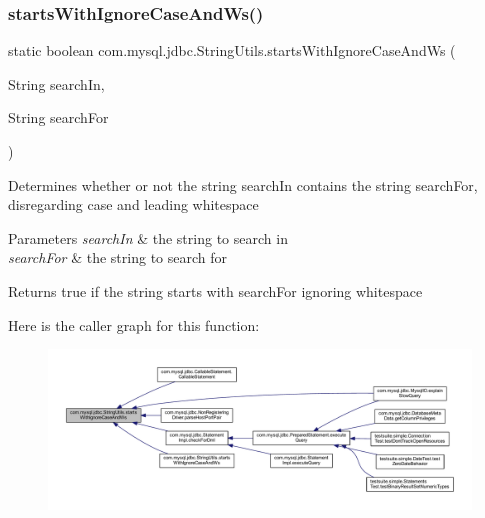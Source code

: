 \subsubsection{\texorpdfstring{starts\+With\+Ignore\+Case\+And\+Ws()}{startsWithIgnoreCaseAndWs()}\hspace{0.1cm}{\footnotesize\ttfamily [1/3]}}
{\footnotesize\ttfamily static boolean com.\+mysql.\+jdbc.\+String\+Utils.\+starts\+With\+Ignore\+Case\+And\+Ws (\begin{DoxyParamCaption}\item[{String}]{search\+In,  }\item[{String}]{search\+For }\end{DoxyParamCaption})\hspace{0.3cm}{\ttfamily [static]}}

Determines whether or not the string \textquotesingle{}search\+In\textquotesingle{} contains the string \textquotesingle{}search\+For\textquotesingle{}, disregarding case and leading whitespace


\begin{DoxyParams}{Parameters}
{\em search\+In} & the string to search in \\
\hline
{\em search\+For} & the string to search for\\
\hline
\end{DoxyParams}
\begin{DoxyReturn}{Returns}
true if the string starts with \textquotesingle{}search\+For\textquotesingle{} ignoring whitespace 
\end{DoxyReturn}
Here is the caller graph for this function\+:
\nopagebreak
\begin{figure}[H]
\begin{center}
\leavevmode
\includegraphics[width=350pt]{classcom_1_1mysql_1_1jdbc_1_1_string_utils_a6b08be3e1e6f1b48cd88d94373acd13b_icgraph}
\end{center}
\end{figure}
\mbox{\label{classcom_1_1mysql_1_1jdbc_1_1_string_utils_a373e54e6ee0066339105f9372a0663e2}} 
